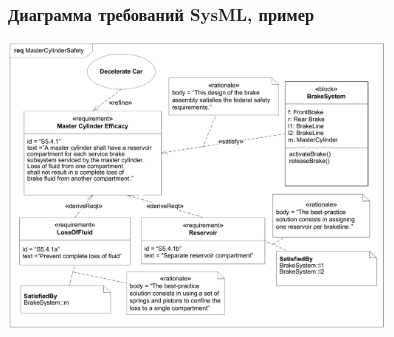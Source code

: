 \documentclass{../../slides-style}
\begin{document}
    \begin{frame}
        \frametitle{Диаграмма требований SysML, пример}
        \begin{center}
            \includegraphics[width=0.75\textwidth]{sysMlRequirementsExample.png}
        \end{center}
    \end{frame}
\end{document}
